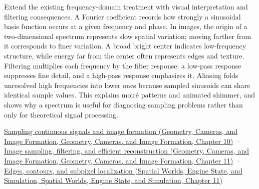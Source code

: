 Extend the existing frequency-domain treatment with visual interpretation and filtering consequences. A Fourier coefficient records how strongly a sinusoidal basis function occurs at a given frequency and phase. In images, the origin of a two-dimensional spectrum represents slow spatial variation; moving farther from it corresponds to finer variation. A broad bright center indicates low-frequency structure, while energy far from the center often represents edges and texture. Filtering multiplies each frequency by the filter response: a low-pass response suppresses fine detail, and a high-pass response emphasizes it. Aliasing folds unresolved high frequencies into lower ones because sampled sinusoids can share identical sample values. This explains moiré patterns and animated shimmer, and shows why a spectrum is useful for diagnosing sampling problems rather than only for theoretical signal processing.

\href{../03-Geometry-Cameras-and-Image-Formation/main.pdf\#nameddest=03-visual-computing-i-ch003-sampling-continuous-signals-and-image-formation}{Sampling continuous signals and image formation (Geometry, Cameras, and Image Formation, Geometry, Cameras, and Image Formation, Chapter 10)} · \href{../03-Geometry-Cameras-and-Image-Formation/main.pdf\#nameddest=03-visual-computing-i-ch004-image-sampling-filtering-and-efficient-reconstruction}{Image sampling, filtering, and efficient reconstruction (Geometry, Cameras, and Image Formation, Geometry, Cameras, and Image Formation, Chapter 11)} · \href{../05-Spatial-Worlds-Engine-State-and-Simulation/main.pdf\#nameddest=04-visual-computing-ii-ch030-edges-contours-and-subpixel-localization}{Edges, contours, and subpixel localization (Spatial Worlds, Engine State, and Simulation, Spatial Worlds, Engine State, and Simulation, Chapter 11)}
